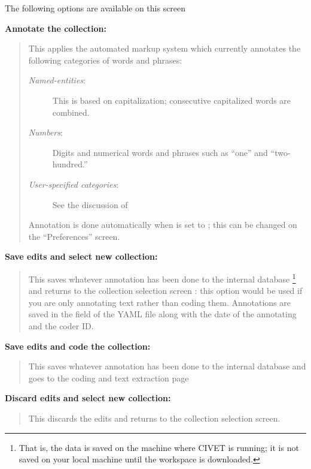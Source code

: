 \documentclass[letterpaper,10pt,english]{sphinxmanual}
\begin{document}
The following options are available on this screen

\textbf{Annotate the collection:}
\begin{quote}

This applies the automated markup system which currently annotates the following
categories of words and phrases:
\begin{description}
\item[{\emph{Named-entities}:}] \leavevmode
This is based on capitalization; consecutive capitalized words
are combined.

\item[{\emph{Numbers}:}] \leavevmode
Digits and numerical words and phrases such as “one” and
“two-hundred.”

\item[{\emph{User-specified categories}:}] \leavevmode
See the discussion of {\hyperref[workspaces:sec-categories]{\emph{}}}

\end{description}

Annotation is done automatically when  is
set to ; this can be changed on the “Preferences” screen.
\end{quote}

\textbf{Save edits and select new collection:}
\begin{quote}

This saves whatever annotation has been done to the internal
database \footnote{
That is, the data is saved on the machine where CIVET is running; it
is not saved on your local machine until the workspace is downloaded.
} and returns to the collection selection screen :
this option would be used if you are only annotating text rather
than coding them. Annotations are saved in the  field
of the YAML file along with the date of the annotating and the
coder ID.
\end{quote}

\textbf{Save edits and code the collection:}
\begin{quote}

This saves whatever annotation has been done to the internal
database and goes to the coding and text extraction page
\end{quote}

\textbf{Discard edits and select new collection:}
\begin{quote}

This discards the edits and returns to the collection selection screen.
\end{quote}
\end{document}
